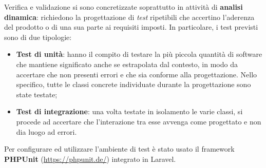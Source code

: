 Verifica e validazione si sono concretizzate soprattutto in attività di \textbf{analisi dinamica}: richiedono la progettazione di \textit{test} ripetibili che accertino l'aderenza del prodotto o di una sua parte ai requisiti imposti. In particolare, i test previsti sono di due tipologie:

\begin{itemize}
	\item \textbf{Test di unità}: hanno il compito di testare la più piccola quantità di software che mantiene significato anche se estrapolata dal contesto, in modo da accertare che non presenti errori e che sia conforme alla progettazione. Nello specifico, tutte le classi concrete individuate durante la progettazione sono state testate;
	\item \textbf{Test di integrazione}: una volta testate in isolamento le varie classi, si procede ad accertare che l'interazione tra esse avvenga come progettato e non dia luogo ad errori.
\end{itemize}

Per configurare ed utilizzare l'ambiente di test è stato usato il framework \textbf{PHPUnit} (\url{https://phpunit.de/}) integrato in Laravel.

